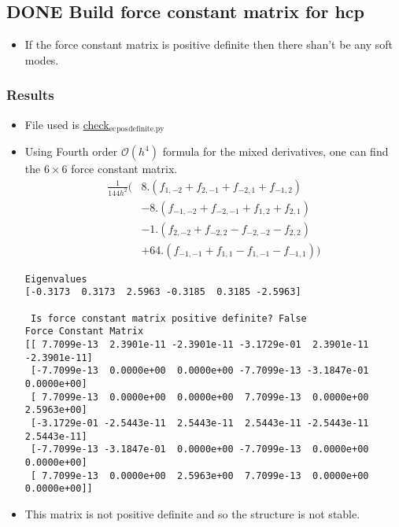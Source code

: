 \documentclass[11pt]{article}
\begin{document}
\subsection{{\bfseries\sffamily DONE} Build force constant matrix for hcp}
\label{sec:org8cf6dd4}
\begin{itemize}
\item If the force constant matrix is positive definite then there shan't be
any soft modes.
\end{itemize}
\subsubsection{Results}
\label{sec:orgb6859a5}
\begin{itemize}
\item File used is \href{file:///home/tigany/Documents/ti/complete\_titanium/ti\_01-11-18/check\_ec\_pos\_definite/check\_ec\_pos\_definite.py}{check\(_{\text{ec}}\)\(_{\text{pos}}\)\(_{\text{definite.py}}\)}
\item Using Fourth order \(\mathcal{O}(h^{4})\) formula for the mixed
derivatives, one can find the \(6\times6\) force constant matrix.
\begin{align}
  \frac{1}{144 h^2} (     &  8.  (  f_{ 1,-2} +  f_{ 2,-1} + f_{-2, 1} + f_{-1, 2} )\\
                         &-  8.  (  f_{-1,-2} +  f_{-2,-1} + f_{ 1, 2} + f_{ 2, 1} )\\
                         &-  1.  (  f_{ 2,-2} +  f_{-2, 2} - f_{-2,-2} - f_{ 2, 2} )\\
                         &+  64. (  f_{-1,-1} +  f_{ 1, 1} - f_{ 1,-1} - f_{-1, 1} )  )
\end{align}

\begin{verbatim}
Eigenvalues
[-0.3173  0.3173  2.5963 -0.3185  0.3185 -2.5963]

 Is force constant matrix positive definite? False
Force Constant Matrix
[[ 7.7099e-13  2.3901e-11 -2.3901e-11 -3.1729e-01  2.3901e-11 -2.3901e-11]
 [-7.7099e-13  0.0000e+00  0.0000e+00 -7.7099e-13 -3.1847e-01  0.0000e+00]
 [ 7.7099e-13  0.0000e+00  0.0000e+00  7.7099e-13  0.0000e+00  2.5963e+00]
 [-3.1729e-01 -2.5443e-11  2.5443e-11  2.5443e-11 -2.5443e-11  2.5443e-11]
 [-7.7099e-13 -3.1847e-01  0.0000e+00 -7.7099e-13  0.0000e+00  0.0000e+00]
 [ 7.7099e-13  0.0000e+00  2.5963e+00  7.7099e-13  0.0000e+00  0.0000e+00]]
\end{verbatim}

\item This matrix is not positive definite and so the structure is not
stable.


\end{itemize}
\end{document}

